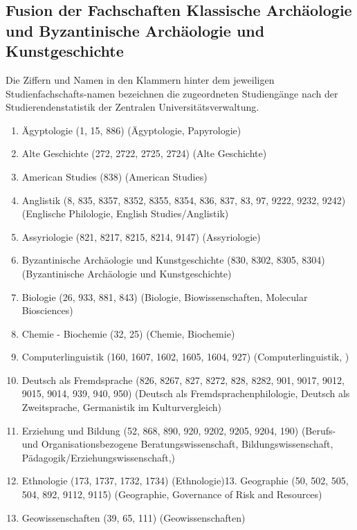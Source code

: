 \subsection{Fusion der Fachschaften Klassische Archäologie und Byzantinische Archäologie und Kunstgeschichte}\label{appendix:2}
    Die  Ziffern  und  Namen  in  den  Klammern  hinter  dem  jeweiligen  Studienfachschafts-namen bezeichnen die zugeordneten Studiengänge nach der Studierendenstatistik der Zentralen Universitätsverwaltung.
    \begin{enumerate}[noitemsep]
        \item Ägyptologie (1, 15, 886) (Ägyptologie, Papyrologie) 
        \item Alte Geschichte (272, 2722, 2725, 2724) (Alte Geschichte) 
        \item American Studies (838) (American Studies) 
        \item Anglistik (8, 835, 8357, 8352, 8355, 8354, 836, 837, 83, 97, 9222, 9232, 9242) (Englische Philologie, English Studies/Anglistik)
        \item Assyriologie (821, 8217, 8215, 8214, 9147) (Assyriologie) 
        \item Byzantinische Archäologie und Kunstgeschichte (830, 8302, 8305, 8304) (Byzantinische Archäologie und Kunstgeschichte) 
        \item Biologie (26, 933, 881, 843) (Biologie, Biowissenschaften, Molecular Biosciences) 
        \item Chemie - Biochemie (32, 25) (Chemie, Biochemie)
        \item Computerlinguistik (160, 1607, 1602, 1605, 1604, 927) (Computerlinguistik, ) 
        \item Deutsch als Fremdsprache (826, 8267, 827, 8272, 828, 8282, 901, 9017, 9012, 9015, 9014, 939, 940, 950) (Deutsch als Fremdsprachenphilologie, Deutsch als Zweitsprache, Germanistik im Kulturvergleich) 
        \item Erziehung und Bildung (52, 868, 890, 920, 9202, 9205, 9204, 190) (Berufs- und Organisationsbezogene Beratungswissenschaft, Bildungswissenschaft, Pädagogik/Erziehungswissenschaft,) 
        \item Ethnologie (173, 1737, 1732, 1734) (Ethnologie)13.  Geographie (50, 502, 505, 504, 892, 9112, 9115) (Geographie, Governance of Risk and Resources) 
        \item Geowissenschaften (39, 65, 111) (Geowissenschaften) 

\end{enumerate}
